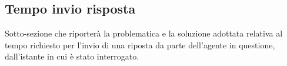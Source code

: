 \subsection{Tempo invio risposta}

Sotto-sezione che riporterà la problematica e la soluzione adottata relativa al tempo richiesto per l'invio di una riposta da parte dell'agente in questione, dall'istante in cui è stato interrogato.
